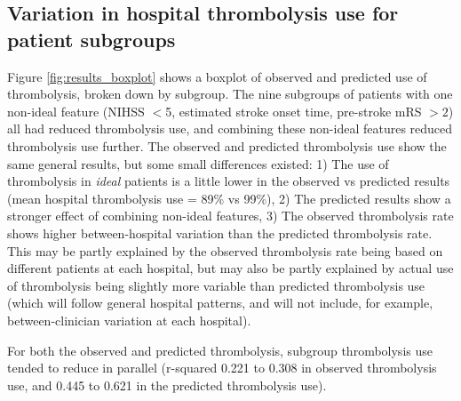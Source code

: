 

\subsection{Variation in hospital thrombolysis use for patient subgroups}

Figure \ref{fig:results_boxplot} shows a boxplot of observed and predicted use of thrombolysis, broken down by subgroup. The nine subgroups of patients with one non-ideal feature (NIHSS $<$5, estimated stroke onset time, pre-stroke mRS $>2$) all had reduced thrombolysis use, and combining these non-ideal features reduced thrombolysis use further. The observed and predicted thrombolysis use show the same general results, but some small differences existed: 1) The use of thrombolysis in \emph{ideal} patients is a little lower in the observed vs predicted results (mean hospital thrombolysis use = 89\% vs 99\%), 2) The predicted results show a stronger effect of combining non-ideal features, 3) The observed thrombolysis rate shows higher between-hospital variation than the predicted thrombolysis rate. This may be partly explained by the observed thrombolysis rate being based on different patients at each hospital, but may also be partly explained by actual use of thrombolysis being slightly more variable than predicted thrombolysis use (which will follow general hospital patterns, and will not include, for example, between-clinician variation at each hospital).

For both the observed and predicted thrombolysis, subgroup thrombolysis use tended to reduce in parallel (r-squared 0.221 to 0.308 in observed thrombolysis use, and 0.445 to 0.621 in the predicted thrombolysis use). 

